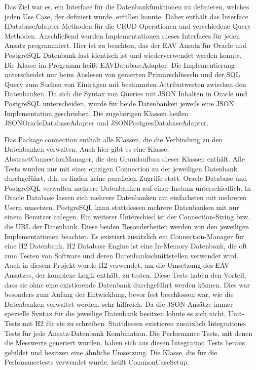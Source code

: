 Das Ziel war es, ein Interface für die Datenbankfunktionen zu definieren, welches jeden Use Case, der definiert wurde, erfüllen konnte. Daher enthält das Interface IDatabaseAdapter Methoden für die CRUD Operationen und verschiedene Query Methoden.
Anschließend wurden Implementationen dieses Interfaces für jeden Ansatz programmiert. Hier ist zu beachten, das der EAV Ansatz für Oracle und PostgreSQL Datenbank fast identisch ist und wiederverwendet werden konnte. Die Klasse im Programm heißt EAV\textunderscore DatabaseAdapter. Die Implementierung unterscheidet nur beim Auslesen von genierten Primärschlüsseln und der SQL Query zum Suchen von Einträgen mit bestimmten Attributwerten zwischen den Datenbanken.
Da sich die Syntax von Queries mit JSON Inhalten in Oracle und PostgreSQL unterscheiden, wurde für beide Datenbanken jeweils eine JSON Implementation geschrieben. Die zugehörigen Klassen heißen JSON\textunderscore Oracle\textunderscore DatabaseAdapter und JSON\textunderscore Postgres\textunderscore DatabaseAdapter.

Das Package connection enthält alle Klassen, die die Verbindung zu den Datenbanken verwalten. Auch hier gibt es eine Klasse, AbstractConnectionManager, die den Grundaufbau dieser Klassen enthält. Alle Tests wurden nur mit einer einzigen Connection zu der jeweiligen Datenbank durchgeführt, d.h. es finden keine parallelen Zugriffe statt.
Oracle Database und PostgreSQL verwalten mehrere Datenbanken auf einer Instanz unterschiedlich. In Oracle Database lassen sich mehrere Datenbanken am einfachsten mit mehreren Usern umsetzen. PostgreSQL kann stattdessen mehrere Datenbanken mit nur einem Benutzer anlegen. Ein weiterer Unterschied ist der Connection-String bzw. die URL der Datenbank. Diese beiden Besonderheiten werden von den jeweiligen Implementationen beachtet.
Es existiert zusätzlich ein Connection-Manager für eine H2 Datenbank. H2 Database Engine ist eine In-Memory Datenbank, die oft zum Testen von Software und deren Datenbankschnittstellen verwendet wird. Auch in diesem Projekt wurde H2 verwendet, um die Umsetzung des EAV Ansatzes, der komplexe Logik enthält, zu testen. Diese Tests haben den Vorteil, dass sie ohne eine existierende Datenbank durchgeführt werden können. Dies war besonders zum Anfang der Entwicklung, bevor fest beschlossen war, wie die Datenbanken verwaltet werden, sehr hilfreich. Da die JSON Ansätze immer spezielle Syntax für die jeweilige Datenbank besitzen lohnte es sich nicht, Unit-Tests mit H2 für sie zu schreiben. Stattdessen existieren zusätzlich Integrations-Tests für jede Ansatz-Datenbank Kombination. Die Performance Tests, mit denen die Messwerte generiert wurden, haben sich aus diesen Integration Tests heraus gebildet und besitzen eine ähnliche Umsetzung. Die Klasse, die für die Perfomancetests verwendet wurde, heißt CommonCaseSetup.

